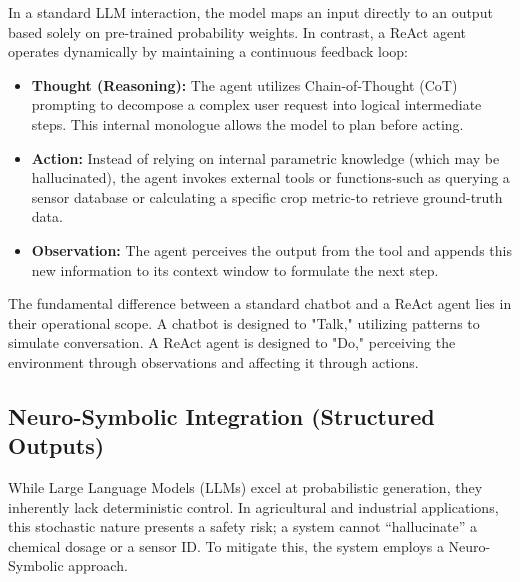 In a standard LLM interaction, the model maps an input directly to an output based solely on pre-trained probability weights. In contrast, a ReAct agent operates dynamically by maintaining a continuous feedback loop:
\begin{itemize}
	\item \textbf{Thought (Reasoning):} The agent utilizes Chain-of-Thought (CoT) prompting to decompose a complex user request into logical intermediate steps. This internal monologue allows the model to plan before acting.
	\item \textbf{Action:} Instead of relying on internal parametric knowledge (which may be hallucinated), the agent invokes external tools or functions-such as querying a sensor database or calculating a specific crop metric-to retrieve ground-truth data.
	\item \textbf{Observation:} The agent perceives the output from the tool and appends this new information to its context window to formulate the next step.
\end{itemize}
The fundamental difference between a standard chatbot and a ReAct agent lies in their operational scope. A chatbot is designed to "Talk," utilizing patterns to simulate conversation. A ReAct agent is designed to "Do," perceiving the environment through observations and affecting it through actions. 
\subsection{Neuro-Symbolic Integration (Structured Outputs)}
While Large Language Models (LLMs) excel at probabilistic generation, they inherently lack deterministic control. In agricultural and industrial applications, this stochastic nature presents a safety risk; a system cannot ``hallucinate'' a chemical dosage or a sensor ID. To mitigate this, the system employs a Neuro-Symbolic approach.

